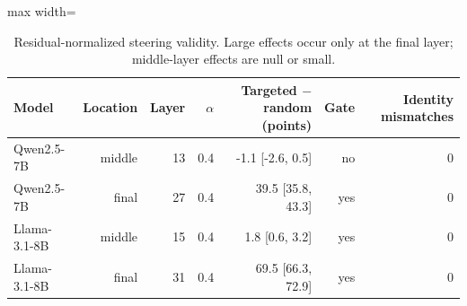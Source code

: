 \begin{table}[htbp]
\centering
\footnotesize
\setlength{\tabcolsep}{4.5pt}
\caption{Residual-normalized steering validity. Large effects occur only at the final layer; middle-layer effects are null or small.}
\label{tab:intervention}
\begin{adjustbox}{max width=\textwidth}
\begin{tabular}{lrrrrrr}
\toprule
Model & Location & Layer & $\alpha$ & Targeted $-$ random (points) & Gate & Identity mismatches \\
\midrule
Qwen2.5-7B & middle & 13 & 0.4 & -1.1 [-2.6, 0.5] & no & 0 \\
Qwen2.5-7B & final & 27 & 0.4 & 39.5 [35.8, 43.3] & yes & 0 \\
Llama-3.1-8B & middle & 15 & 0.4 & 1.8 [0.6, 3.2] & yes & 0 \\
Llama-3.1-8B & final & 31 & 0.4 & 69.5 [66.3, 72.9] & yes & 0 \\
\bottomrule
\end{tabular}
\end{adjustbox}
\end{table}
